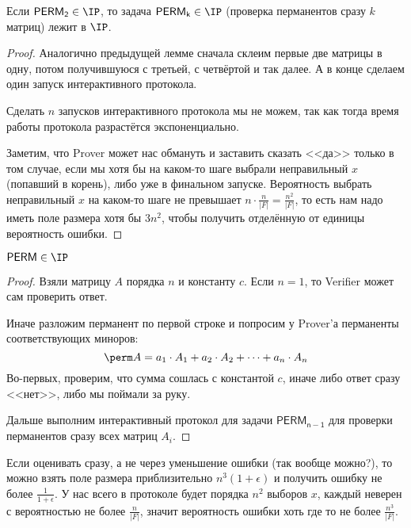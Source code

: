 	\begin{lemma}
		Если $\mathsf{PERM_2} \in \IP$, то
		задача $\mathsf{PERM_k} \in \IP$ (проверка перманентов сразу $k$ матриц) лежит в $\IP$.
	\end{lemma}
	\begin{proof}
		Аналогично предыдущей лемме сначала склеим первые две матрицы в одну, потом получившуюся с третьей, с четвёртой и так далее.
		А в конце сделаем один запуск интерактивного протокола.
		\begin{Rem}
			Сделать $n$ запусков интерактивного протокола мы не можем, так как тогда время работы протокола разрастётся экспоненциально.
		\end{Rem}

		Заметим, что Prover может нас обмануть и заставить сказать <<да>> только в том случае, если мы хотя бы на каком-то шаге выбрали неправильный $x$ (попавший в корень), либо уже
		в финальном запуске.
		Вероятность выбрать неправильный $x$ на каком-то шаге не превышает $n\cdot\frac{n}{|F|} = \frac{n^2}{|F|}$, то есть нам надо иметь поле размера хотя бы $3n^2$, чтобы получить отделённую от единицы вероятность ошибки.
	\end{proof}

	\begin{theorem}
		$\mathsf{PERM} \in \IP$
	\end{theorem}
	\begin{proof}
		Взяли матрицу $A$ порядка $n$ и константу $c$.
		Если $n=1$, то Verifier может сам проверить ответ.

		Иначе разложим перманент по первой строке и попросим у Prover'а перманенты соответствующих миноров:
		\[
			\perm A = a_1 \cdot A_1 + a_2 \cdot A_2 + \dots + a_n \cdot A_n
		\]
		Во-первых, проверим, что сумма сошлась с константой $c$, иначе либо ответ сразу <<нет>>, либо мы поймали за руку.

		Дальше выполним интерактивный протокол для задачи $\mathsf{PERM_{n-1}}$ для проверки перманентов сразу всех матриц $A_i$.
	\end{proof}

	\begin{Rem}
		Если оценивать сразу, а не через уменьшение ошибки (так вообще можно?), то можно взять поле размера приблизительно $n^3(1+\epsilon)$ и получить ошибку не более $\frac{1}{1+\epsilon}$.
		У нас всего в протоколе будет порядка $n^2$ выборов $x$, каждый неверен с вероятностью не более $\frac{n}{|F|}$, значит вероятность ошибки хоть где то не более $\frac{n^3}{|F|}$.
	\end{Rem}
